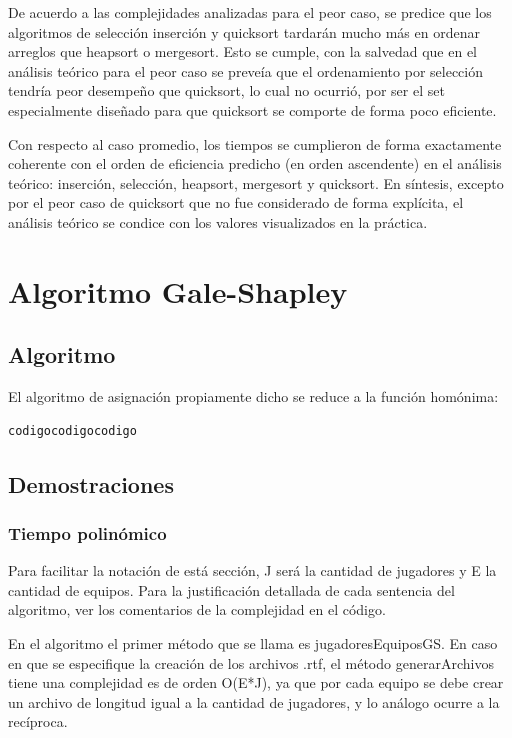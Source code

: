 \documentclass[article,a4paper]{article}
\begin{document}
De acuerdo a las complejidades analizadas para el peor caso, se predice que los algoritmos de selección inserción y quicksort tardarán mucho más en ordenar arreglos que heapsort o mergesort. Esto se cumple, con la salvedad que en el análisis teórico para el peor caso se preveía que el ordenamiento por selección tendría peor desempeño que quicksort, lo cual no ocurrió, por ser el set especialmente diseñado para que quicksort se comporte de forma poco eficiente.

Con respecto al caso promedio, los tiempos se cumplieron de forma exactamente coherente con el orden de eficiencia predicho (en orden ascendente) en el análisis teórico: inserción, selección, heapsort, mergesort y quicksort. En síntesis, excepto por el peor caso de quicksort que no fue considerado de forma explícita, el análisis teórico se condice con los valores visualizados en la práctica.


\section{Algoritmo Gale-Shapley}

\subsection{Algoritmo}

El algoritmo de asignación propiamente dicho se reduce a la función homónima:

\begin{verbatim}
codigocodigocodigo
\end{verbatim}

\subsection{Demostraciones}

\subsubsection{Tiempo polinómico}

Para facilitar la notación de está sección, J será la cantidad de jugadores y E la cantidad de equipos. Para la justificación detallada de cada sentencia del algoritmo, ver los comentarios de la complejidad en el código.

En el algoritmo el primer método que se llama es jugadoresEquiposGS. En caso en que se especifique la creación de los archivos .rtf, el método generarArchivos tiene una complejidad es de orden O(E*J), ya que por cada equipo se debe crear un archivo de longitud igual a la cantidad de jugadores, y lo análogo ocurre a la recíproca.
\end{document}
